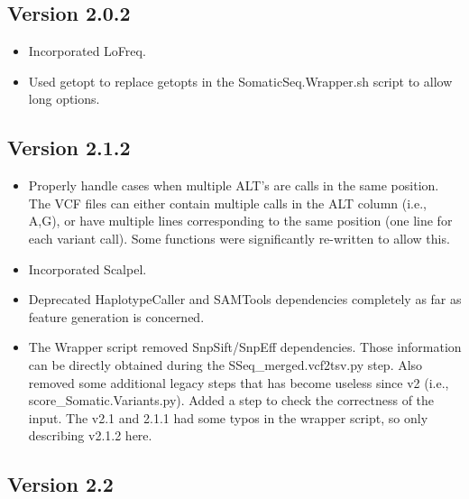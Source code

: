 \documentclass[10pt,letterpaper]{article}
\begin{document}
\begin{sloppypar}
\subsection{Version 2.0.2}

\begin{itemize}

  \item
  Incorporated LoFreq.
  
  \item
  Used getopt to replace getopts in the SomaticSeq.Wrapper.sh script to allow long options. 
  
\end{itemize}



\subsection{Version 2.1.2}

\begin{itemize}

  \item
  Properly handle cases when multiple ALT's are calls in the same position. The VCF files can either contain multiple calls in the ALT column (i.e., A,G), or have multiple lines corresponding to the same position (one line for each variant call). Some functions were significantly re-written to allow this.

  \item
  Incorporated Scalpel.
  
  \item
  Deprecated HaplotypeCaller and SAMTools dependencies completely as far as feature generation is concerned.
  
  \item
  The Wrapper script removed SnpSift/SnpEff dependencies. Those information can be directly obtained during the SSeq\_merged.vcf2tsv.py step. Also removed some additional legacy steps that has become useless since v2 (i.e., score\_Somatic.Variants.py). Added a step to check the correctness of the input. The v2.1 and 2.1.1 had some typos in the wrapper script, so only describing v2.1.2 here.

\end{itemize}



\subsection{Version 2.2}


\end{sloppypar}
\end{document}
